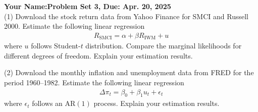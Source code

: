 \documentclass[final,11pt]{article}
\begin{document}
\thispagestyle{empty}
\begin{spacing}{1.25}

\textbf{Your Name:\hfill Problem Set 3, Due: Apr. 20, 2025}\\

(1) Download the stock return data from Yahoo Finance for SMCI and Russell 2000. Estimate the following linear regression
\begin{gather}
    R_{\text{SMCI}}=\alpha+\beta R_{\text{IWM}}+u
\end{gather}
where $u$ follows Student-$t$ distribution. Compare the marginal likelihoods for different degrees of freedom. Explain your estimation results.

\newpage

(2) Download the monthly inflation and unemployment data from FRED for the period 1960--1982. Estimate the following linear regression
\begin{gather}
    \Delta\pi_t=\beta_0+\beta_1 u_t+\epsilon_t
\end{gather}
where $\epsilon_t$ follows an AR$(1)$ process. Explain your estimation results.

\end{spacing}
\end{document}
